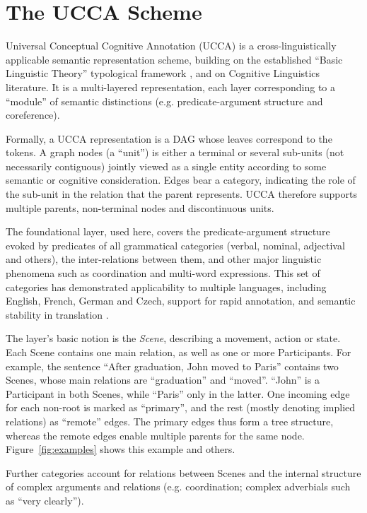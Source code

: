 \documentclass[11pt]{article}
\newcommand{\figref}[1]{Figure~\ref{#1}}
\begin{document}

\section{The UCCA Scheme}\label{sec:ucca}
Universal Conceptual Cognitive Annotation (UCCA)
is a cross-linguistically applicable semantic representation scheme,
building on the established ``Basic Linguistic Theory'' typological framework
\cite{Dixon:10b,Dixon:10a,Dixon:12}, and on Cognitive Linguistics literature.
It is a multi-layered representation, each layer corresponding to a ``module'' of
semantic distinctions (e.g. predicate-argument structure and coreference).

Formally, a UCCA representation is a DAG whose leaves correspond to the tokens.
A graph nodes (a ``unit'') is either a terminal or several
sub-units (not necessarily contiguous) jointly viewed as a
single entity according to some semantic or cognitive consideration.
Edges bear a category, indicating the role of the sub-unit in the relation that the parent represents.
UCCA therefore supports multiple parents, non-terminal nodes and discontinuous units.

The foundational layer, used here, covers the predicate-argument
structure evoked by predicates of all grammatical categories
(verbal, nominal, adjectival and others), the inter-relations between them,
and other major linguistic phenomena such as coordination and multi-word expressions.
This set of categories has demonstrated applicability to multiple languages, including
English, French, German and Czech, support for rapid annotation, and semantic stability in translation \cite{sulem2015conceptual}.

The layer's basic notion is the {\it Scene}, describing a movement, action or state.
Each Scene contains one main relation, as well as one or more Participants.
For example, the sentence ``After graduation, John moved to Paris'' contains two Scenes,
whose main relations are ``graduation'' and ``moved''. ``John'' is a Participant in both Scenes,
while ``Paris'' only in the latter.
One incoming edge for each non-root is marked as ``primary'',
and the rest (mostly denoting implied relations) as ``remote'' edges.
The primary edges thus form a tree structure,
whereas the remote edges enable multiple parents for the same node.
\figref{fig:examples} shows this example and others.

Further categories account for relations between Scenes and the internal structure of
complex arguments and relations
(e.g. coordination; complex adverbials such as ``very clearly'').
\end{document}
